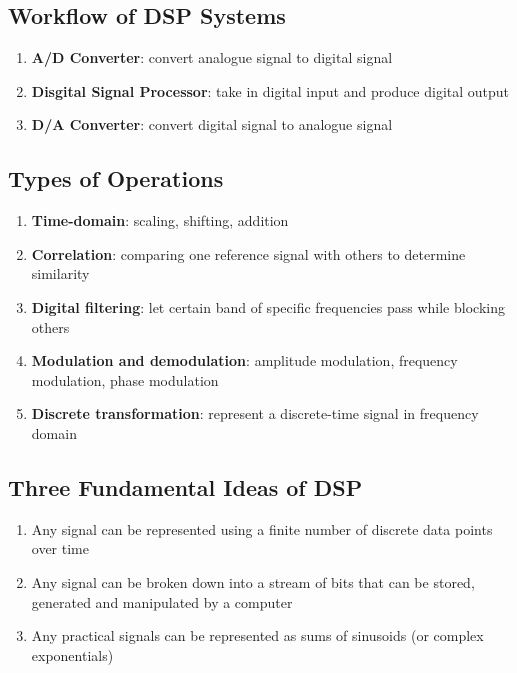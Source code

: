  \subsection{Workflow of DSP Systems}

    \begin{enumerate}
      \item \textbf{A/D Converter}: convert analogue signal to digital signal
      \item \textbf{Disgital Signal Processor}: take in digital input and
      produce digital output
      \item \textbf{D/A Converter}: convert digital signal to analogue signal
    \end{enumerate}

  \subsection{Types of Operations}

    \begin{enumerate}
      \item \textbf{Time-domain}: scaling, shifting, addition
      \item \textbf{Correlation}: comparing one reference signal with others
      to determine similarity
      \item \textbf{Digital filtering}: let certain band of specific frequencies
      pass while blocking others
      \item \textbf{Modulation and demodulation}: amplitude modulation,
      frequency modulation, phase modulation
      \item \textbf{Discrete transformation}: represent a discrete-time signal
      in frequency domain
    \end{enumerate}

  \subsection{Three Fundamental Ideas of DSP}

    \begin{enumerate}
      \item Any signal can be represented using a finite number of discrete
      data points over time
      \item Any signal can be broken down into a stream of bits that can
      be stored, generated and manipulated by a computer
      \item Any practical signals can be represented as sums of sinusoids
      (or complex exponentials)
    \end{enumerate}

